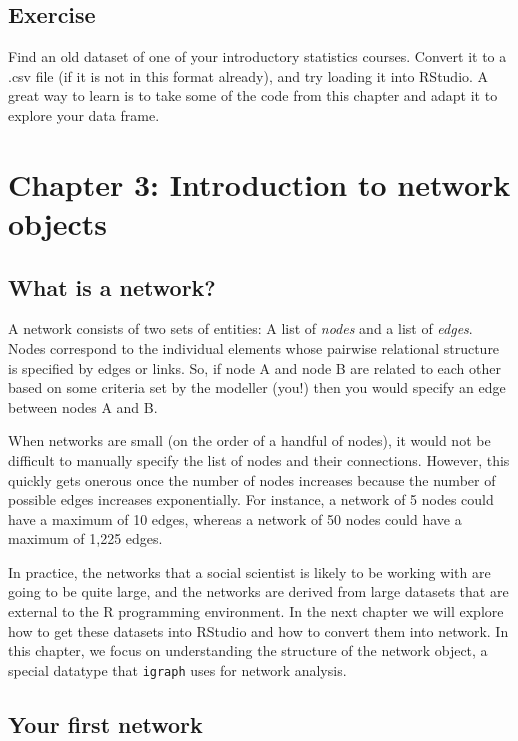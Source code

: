 \documentclass[
]{book}
\begin{document}
\section{Exercise}\label{exercise-1}

Find an old dataset of one of your introductory statistics courses. Convert it to a .csv file (if it is not in this format already), and try loading it into RStudio. A great way to learn is to take some of the code from this chapter and adapt it to explore your data frame.

\chapter{Chapter 3: Introduction to network objects}\label{ch3}

\section{What is a network?}\label{what-is-a-network}

A network consists of two sets of entities: A list of \emph{nodes} and a list of \emph{edges}. Nodes correspond to the individual elements whose pairwise relational structure is specified by edges or links. So, if node A and node B are related to each other based on some criteria set by the modeller (you!) then you would specify an edge between nodes A and B.

When networks are small (on the order of a handful of nodes), it would not be difficult to manually specify the list of nodes and their connections. However, this quickly gets onerous once the number of nodes increases because the number of possible edges increases exponentially. For instance, a network of 5 nodes could have a maximum of 10 edges, whereas a network of 50 nodes could have a maximum of 1,225 edges.

In practice, the networks that a social scientist is likely to be working with are going to be quite large, and the networks are derived from large datasets that are external to the R programming environment. In the next chapter we will explore how to get these datasets into RStudio and how to convert them into network. In this chapter, we focus on understanding the structure of the network object, a special datatype that \texttt{igraph} uses for network analysis.

\section{Your first network}\label{your-first-network}
\end{document}
